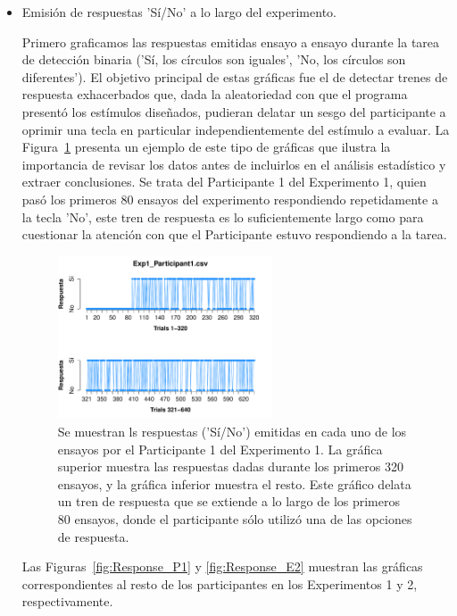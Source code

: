 \begin{itemize}
\item Emisión de respuestas 'Sí/No' a lo largo del experimento.

Primero graficamos las respuestas emitidas ensayo a ensayo durante la tarea de detección binaria ('Sí, los círculos son iguales', 'No, los círculos son diferentes'). El objetivo principal de estas gráficas fue el de detectar trenes de respuesta exhacerbados que, dada la aleatoriedad con que el programa presentó los estímulos diseñados, pudieran delatar un sesgo del participante a oprimir una tecla en particular independientemente del estímulo a evaluar. La Figura~\ref{fig:Resp_E1_P1} presenta un ejemplo de este tipo de gráficas que ilustra la importancia de revisar los datos antes de incluirlos en el análisis estadístico y extraer conclusiones. Se trata del Participante 1 del Experimento 1, quien pasó los primeros 80 ensayos del experimento respondiendo repetidamente a la tecla 'No', este tren de respuesta es lo suficientemente largo como para cuestionar la atención con que el Participante estuvo respondiendo a la tarea.\\ 

\begin{figure}[th]
\centering
\includegraphics[width=0.60\textwidth]{Figures/Response_Exp1_P1} 
\caption[Respuesta emitida por ensayo; ejemplo de participante sesgado]{Se muestran ls respuestas ('Sí/No') emitidas en cada uno de los ensayos por el Participante 1 del Experimento 1. La gráfica superior muestra las respuestas dadas durante los primeros 320 ensayos, y la gráfica inferior muestra el resto. Este gráfico delata un tren de respuesta que se extiende a lo largo de los primeros 80 ensayos, donde el participante sólo utilizó una de las opciones de respuesta.}
\label{fig:Resp_E1_P1}
\end{figure}

Las Figuras~\ref{fig:Response_P1} y \ref{fig:Response_E2} muestran las gráficas correspondientes al resto de los participantes en los Experimentos 1 y 2, respectivamente.\\


\end{itemize}
